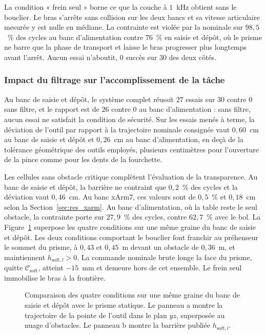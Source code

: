 La condition « frein seul » borne ce que la couche à $1$~kHz obtient sans le bouclier. Le bras s'arrête sans collision sur les deux bancs et sa vitesse articulaire mesurée y est nulle en médiane. La contrainte est violée par la nominale sur $98{,}5$~\% des cycles au banc d'alimentation contre $76$~\% en saisie et dépôt, où le prisme ne barre que la phase de transport et laisse le bras progresser plus longtemps avant l'arrêt. Aucun essai n'aboutit, $0$ succès sur $30$ des deux côtés.

\subsubsection{Impact du filtrage sur l'accomplissement de la tâche}
Au banc de saisie et dépôt, le système complet réussit $27$ essais sur $30$ contre $0$ sans filtre, et le rapport est de $26$ contre $0$ au banc d'alimentation : sans filtre, aucun essai ne satisfait la condition de sécurité. Sur les essais menés à terme, la déviation de l'outil par rapport à la trajectoire nominale consignée vaut $0{,}60$~cm au banc de saisie et dépôt et $0{,}26$~cm au banc d'alimentation, en deçà de la tolérance géométrique des outils employés, plusieurs centimètres pour l'ouverture de la pince comme pour les dents de la fourchette.

Les cellules sans obstacle critique complètent l'évaluation de la transparence. Au banc de saisie et dépôt, la barrière ne contraint que $0{,}2$~\% des cycles et la déviation vaut $0{,}46$~cm. Au banc xArm7, ces valeurs sont de $0{,}5$~\% et $0{,}18$~cm selon la Section~\ref{sec:res_xarm}. Au banc d'alimentation, où la table reste le seul obstacle, la contrainte porte sur $27{,}9$~\% des cycles, contre $62{,}7$~\% avec le bol. La Figure~\ref{fig:comparaison_avec_sans} superpose les quatre conditions sur une même graine du banc de saisie et dépôt. Les deux conditions comportant le bouclier font franchir au préhenseur le sommet du prisme, à $0{,}43$ et $0{,}45$~m devant un obstacle de $0{,}36$~m, et maintiennent $h_{\mathrm{soft},l}>0$. La commande nominale brute longe la face du prisme, quitte $\mathcal{C}_{\mathrm{soft}}$, atteint $-15$~mm et demeure hors de cet ensemble. Le frein seul immobilise le bras à la frontière.

\begin{figure}[!htbp]
    \centering
    
    \caption[Trajectoires et barrières publiées dans les quatre régimes]{Comparaison des quatre conditions sur une même graine du banc de saisie et dépôt avec le prisme statique. Le panneau a montre la trajectoire de la pointe de l'outil dans le plan $yz$, superposée au nuage d'obstacles. Le panneau b montre la barrière publiée $h_{\mathrm{soft},l}$.}\label{fig:comparaison_avec_sans}
\end{figure}

